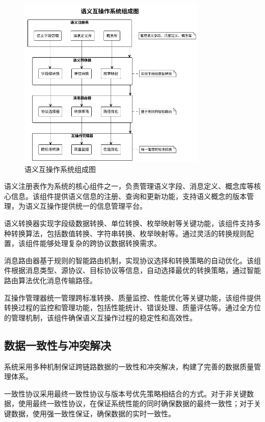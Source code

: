 \begin{figure}[H]
    \centering
    \includegraphics[width=0.8\textwidth]{chapters/fig-0/semantic_interop_system_simple.png}
    \caption{语义互操作系统组成图}
    \label{fig:semantic_interop_system}
\end{figure}

语义注册表作为系统的核心组件之一，负责管理语义字段、消息定义、概念库等核心信息。该组件提供语义信息的注册、查询和更新功能，支持语义概念的版本管理，为语义互操作提供统一的信息管理平台。

语义转换器实现字段级数据转换、单位转换、枚举映射等关键功能，该组件支持多种转换算法，包括数值转换、字符串转换、枚举映射等。通过灵活的转换规则配置，该组件能够处理复杂的跨协议数据转换需求。

消息路由器基于规则的智能路由机制，实现协议选择和转换策略的自动优化。该组件根据消息类型、源协议、目标协议等信息，自动选择最优的转换策略，通过智能路由算法优化消息传输路径。

互操作管理器统一管理跨标准转换、质量监控、性能优化等关键功能，该组件提供转换过程的监控和管理功能，包括性能统计、错误处理、质量评估等。通过全方位的管理机制，该组件确保语义互操作过程的稳定性和高效性。

\subsection{数据一致性与冲突解决}

系统采用多种机制保证跨链路数据的一致性和冲突解决，构建了完善的数据质量管理体系。

一致性协议采用最终一致性协议与版本号优先策略相结合的方式。对于非关键数据，使用最终一致性协议，在保证系统性能的同时确保数据的最终一致性；对于关键数据，使用强一致性保证，确保数据的实时一致性。

